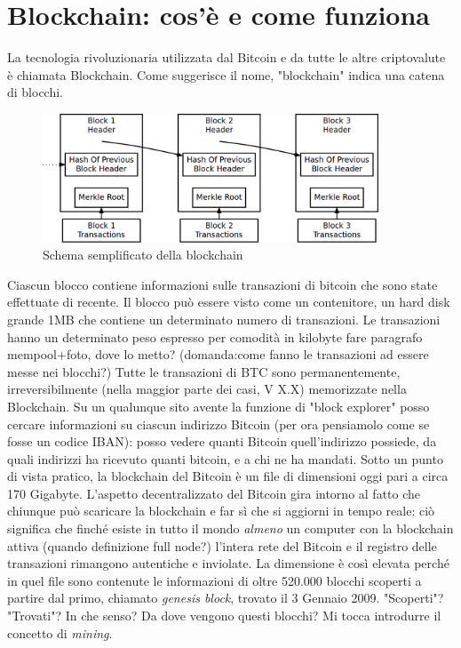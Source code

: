 \documentclass {article}
\begin{document}
\section {Blockchain: cos'è e come funziona}


La tecnologia rivoluzionaria utilizzata dal Bitcoin e da tutte le altre criptovalute è chiamata Blockchain.
Come suggerisce il nome, "blockchain" indica una catena di blocchi.

\vspace {0.5cm}
\begin{figure}[h]
\includegraphics [width = 10cm] {blockchain2.png}
\centering
\caption {Schema semplificato della blockchain}
\end{figure}
\vspace {0.2cm}
\noindent
%
Ciascun blocco contiene informazioni sulle transazioni di bitcoin che sono state effettuate di recente.
Il blocco può essere visto come un contenitore, un hard disk grande 1MB che contiene un determinato numero di transazioni.
Le transazioni hanno un determinato peso espresso per comodità in kilobyte fare paragrafo mempool+foto, dove lo metto? (domanda:come fanno le transazioni ad essere messe nei blocchi?)
Tutte le transazioni di BTC sono permanentemente, irreversibilmente (nella maggior parte dei casi, V X.X) memorizzate nella Blockchain.
Su un qualunque sito avente la funzione di "block explorer" posso cercare informazioni su ciascun indirizzo Bitcoin (per ora pensiamolo come se fosse un codice IBAN): posso vedere quanti Bitcoin quell'indirizzo possiede, da quali indirizzi ha ricevuto quanti bitcoin, e a chi ne ha mandati.
Sotto un punto di vista pratico, la blockchain del Bitcoin è un file di dimensioni oggi pari a circa 170 Gigabyte.
L'aspetto decentralizzato del Bitcoin gira intorno al fatto che chiunque può scaricare la blockchain e far sì che si aggiorni in tempo reale: ciò significa che finché esiste in tutto il mondo \emph{almeno} un computer con la blockchain attiva (quando definizione full node?) l'intera rete del Bitcoin e il registro delle transazioni rimangono autentiche e inviolate.
La dimensione è così elevata perché in quel file sono contenute le informazioni di oltre 520.000 blocchi scoperti a partire dal primo, chiamato \textit{genesis block}, trovato il 3 Gennaio 2009.
"Scoperti"? "Trovati"? In che senso? Da dove vengono questi blocchi? Mi tocca introdurre il concetto di \textit{mining}.
\end{document}
